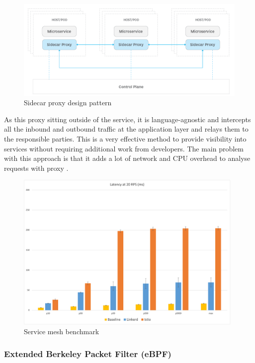 \begin{figure}[H]
    \includegraphics[width=16cm]{assets/literature-review/sidecar-proxy.png}
    \caption{Sidecar proxy design pattern \citep{Whatissi48:online}}
    \label{fig:sidecar-proxy}
\end{figure}

As this proxy sitting outside of the service, it is language-agnostic and intercepts all the inbound and outbound traffic at the application layer and relays them to the responsible parties. This is a very effective method to provide visibility into services without requiring additional work from developers. The main problem with this approach is that it adds a lot of network and CPU overhead to analyse requests with proxy \citep{Benchmar93:online}.

\begin{figure}[H]
    \includegraphics[width=11cm]{assets/literature-review/linkerd-benchmark.png}
    \caption{Service mesh benchmark \citep{Benchmar93:online}}
    \label{fig:linkerd-benchmark}
\end{figure}

\subsubsection{Extended Berkeley Packet Filter (eBPF)}

